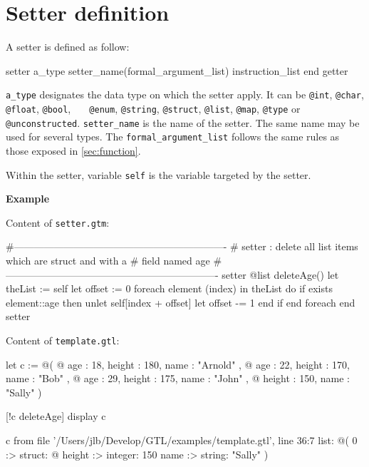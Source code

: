 \documentclass[10pt,openright,twosides,final]{memoir}
\newcommand{\gtlinline}[1]{\colorbox{light-blue}{\lstinline[language=gtl]{#1}}}
\newcommand{\example}{\vspace{.75em}\noindent\textbf{Example}\vspace{0em}}
\begin{document}
\section{Setter definition}

A setter is defined as follow:

\begin{gtl}
setter a_type setter_name(formal_argument_list)
  instruction_list
end getter
\end{gtl}

\gtlinline{a_type} designates the data type on which the setter apply. It can be \gtlinline{@int},  \gtlinline{@char}, \gtlinline{@float}, \gtlinline{@bool}, \gtlinline{	@enum}, \gtlinline{@string}, \gtlinline{@struct}, \gtlinline{@list}, \gtlinline{@map}, \gtlinline{@type} or \gtlinline{@unconstructed}. \gtlinline{setter_name} is the name of the setter. The same name may be used for several types. The \gtlinline{formal_argument_list} follows the same rules as those exposed in \ref{sec:function}.

Within the setter, variable \gtlinline{self} is the variable targeted by the setter.

\example

\noindent Content of \texttt{\footnotesize setter.gtm}:
\begin{gtl}
#----------------------------------------------------------------
# setter : delete all list items which are struct and with a
# field named age
#----------------------------------------------------------------
setter @list deleteAge()
  let theList := self
  let offset := 0
  foreach element (index) in theList do
    if exists element::age then
      unlet self[index + offset]
      let offset -= 1
    end if
  end foreach
end setter
\end{gtl}

\noindent Content of \texttt{\footnotesize template.gtl}:
\begin{gtl}
let c := @(
  @{ age : 18, height : 180, name : "Arnold" },
  @{ age : 22, height : 170, name : "Bob"    },
  @{ age : 29, height : 175, name : "John"   },
  @{           height : 150, name : "Sally"  }
)

[!c deleteAge]
display c
\end{gtl}
\begin{console}
c from file '/Users/jlb/Develop/GTL/examples/template.gtl', line 36:7
    list: @(
        0 :>
            struct: @{
                height :>
                    integer: 150
                name :>
                    string: "Sally"
            }
    )
\end{console}
\end{document}
